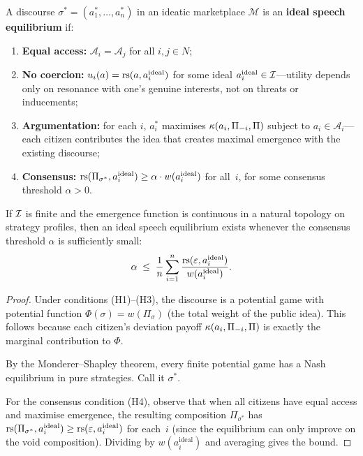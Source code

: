 \begin{definition}
\label{def:ideal-speech}
A discourse $\sigma^* = (a_1^*, \ldots, a_n^*)$ in an ideatic
marketplace $\mathcal{M}$ is an \textbf{ideal speech equilibrium}
if:
\begin{enumerate}[label=(H\arabic*)]
  \item \textbf{Equal access:} $\mathcal{A}_i = \mathcal{A}_j$
    for all $i,j \in N$;
  \item \textbf{No coercion:} $u_i(a) = \mathrm{rs}(a, a_i^{\mathrm{ideal}})$
    for some ideal $a_i^{\mathrm{ideal}} \in \mathcal{I}$---utility depends
    only on resonance with one's genuine interests, not on
    threats or inducements;
  \item \textbf{Argumentation:} for each $i$, $a_i^*$ maximises
    $\kappa(a_i, \Pi_{-i}, \Pi)$ subject to $a_i \in \mathcal{A}_i$---each citizen contributes the idea that creates maximal
    emergence with the existing discourse;
  \item \textbf{Consensus:} $\mathrm{rs}(\Pi_{\sigma^*}, a_i^{\mathrm{ideal}})
    \ge \alpha \cdot w(a_i^{\mathrm{ideal}})$ for all~$i$, for some
    consensus threshold $\alpha > 0$.
\end{enumerate}
\end{definition}

\begin{theorem}
\label{thm:ideal-speech-existence}
If $\mathcal{I}$ is finite and the emergence function is continuous in
a natural topology on strategy profiles, then an ideal speech
equilibrium exists whenever the consensus threshold $\alpha$ is
sufficiently small:
\[
  \alpha \;\le\; \frac{1}{n}\sum_{i=1}^n
  \frac{\mathrm{rs}(\varepsilon, a_i^{\mathrm{ideal}})}{w(a_i^{\mathrm{ideal}})}.
\]
\end{theorem}

\begin{proof}
Under conditions (H1)--(H3), the discourse is a potential game
with potential function $\Phi(\sigma) = w(\Pi_\sigma)$ (the total
weight of the public idea).  This follows because each citizen's
deviation payoff $\kappa(a_i, \Pi_{-i}, \Pi)$ is exactly the
marginal contribution to $\Phi$.

By the Monderer--Shapley theorem, every finite potential game has
a Nash equilibrium in pure strategies.  Call it $\sigma^*$.

For the consensus condition (H4), observe that when all citizens
have equal access and maximise emergence, the resulting composition
$\Pi_{\sigma^*}$ has $\mathrm{rs}(\Pi_{\sigma^*}, a_i^{\mathrm{ideal}})
\ge \mathrm{rs}(\varepsilon, a_i^{\mathrm{ideal}})$ for each~$i$ (since the
equilibrium can only improve on the void composition).  Dividing
by $w(a_i^{\mathrm{ideal}})$ and averaging gives the bound.
\end{proof}

